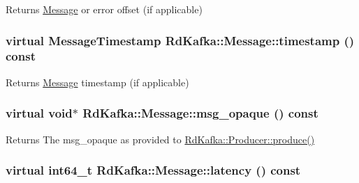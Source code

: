 \label{classRdKafka_1_1Message_a5a8efc75fd27f8839997fc506776db67}
\begin{DoxyReturn}{Returns}
\hyperlink{classRdKafka_1_1Message}{Message} or error offset (if applicable) 
\end{DoxyReturn}
\hypertarget{classRdKafka_1_1Message_a710964fe3cfdf9555d176d1a6047a1ec}{
\subsubsection[{timestamp}]{\setlength{\rightskip}{0pt plus 5cm}virtual {\bf MessageTimestamp} RdKafka::Message::timestamp () const}}
\label{classRdKafka_1_1Message_a710964fe3cfdf9555d176d1a6047a1ec}
\begin{DoxyReturn}{Returns}
\hyperlink{classRdKafka_1_1Message}{Message} timestamp (if applicable) 
\end{DoxyReturn}
\hypertarget{classRdKafka_1_1Message_ae13ce414d2c6ad68ddefc4ccca640f17}{
\subsubsection[{msg\_\-opaque}]{\setlength{\rightskip}{0pt plus 5cm}virtual void$\ast$ RdKafka::Message::msg\_\-opaque () const}}
\label{classRdKafka_1_1Message_ae13ce414d2c6ad68ddefc4ccca640f17}
\begin{DoxyReturn}{Returns}
The {\ttfamily msg\_\-opaque} as provided to \hyperlink{classRdKafka_1_1Producer_ab90a30c5e5fb006a3b4004dc4c9a7923}{RdKafka::Producer::produce()} 
\end{DoxyReturn}
\hypertarget{classRdKafka_1_1Message_a8cce832cbab290d193b028ca3f689b07}{
\subsubsection[{latency}]{\setlength{\rightskip}{0pt plus 5cm}virtual int64\_\-t RdKafka::Message::latency () const}}
